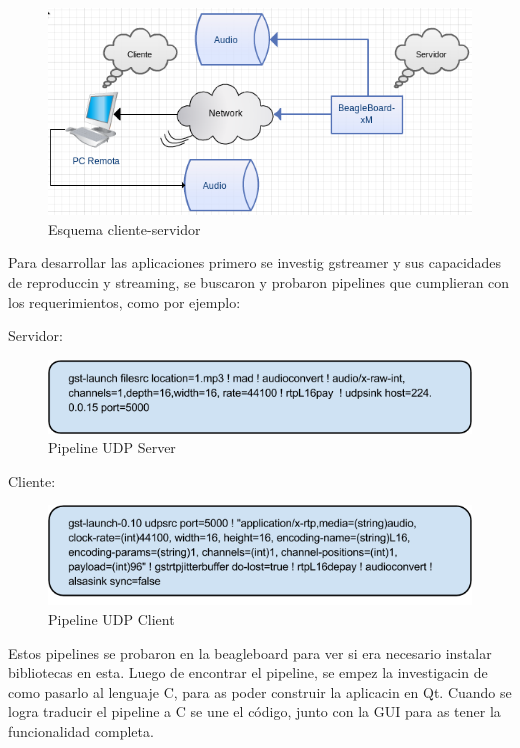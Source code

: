 \documentclass[%
	final,
	reprint,
	notitlepage,
	narroweqnarray,
	inline,
	twoside,
        invited,
	]{ieee}
\begin{document}
\begin{figure}[hbtp]
\includegraphics[scale=0.5]{Diagrama1.png}
\caption{Esquema cliente-servidor}
\end{figure}

Para desarrollar las aplicaciones primero se investig gstreamer y sus capacidades de reproduccin y streaming, se buscaron y probaron pipelines que cumplieran con los requerimientos, como por ejemplo:

Servidor:

\begin{figure}[hbtp]
\includegraphics[scale=0.4]{sHLG4TD6qldYM4Yfh1m1DlA.png}
\caption{Pipeline UDP Server}
\end{figure}

Cliente:

\begin{figure}[hbtp]
\includegraphics[scale=0.4]{sq5lrprsXxVFWBa8R1s-7yg.png}
\caption{Pipeline UDP Client}
\end{figure}

Estos pipelines se probaron en la beagleboard para ver si era necesario instalar bibliotecas en esta.
Luego de encontrar el pipeline, se empez la investigacin de como pasarlo al lenguaje C, para as poder construir la aplicacin en Qt. Cuando se logra traducir el pipeline a C se une el código, junto con la GUI para as tener la funcionalidad completa.
\end{document}
